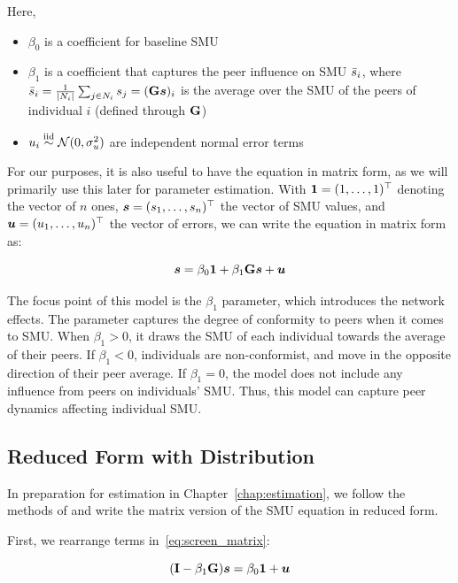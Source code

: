 Here,

\begin{itemize}
    \item $\beta_0$ is a coefficient for baseline SMU
    \item $\beta_1$ is a coefficient that captures the peer influence on SMU $\bar{s}_i$, where $\bar{s}_i = \frac{1}{|N_i|}\sum_{j \in N_i} s_j = (\mathbf{G}\bm{s})_i$ is the average over the SMU of the peers of individual $i$ (defined through $\mathbf{G}$)
    \item $u_i \stackrel{\text{iid}}{\sim} \mathcal{N}(0, \sigma_u^2)$ are independent normal error terms
\end{itemize}

For our purposes, it is also useful to have the equation in matrix form, as we will primarily use this later for parameter estimation. With $\bm{1} = (1, \ldots, 1)^\top$ denoting the vector of $n$ ones, $\bm{s} = (s_1, \ldots, s_n)^\top$ the vector of SMU values, and $\bm{u} = (u_1, \ldots, u_n)^\top$ the vector of errors, we can write the equation in matrix form as:

\begin{equation}
\label{eq:screen_matrix}
    \bm{s} = \beta_0 \bm{1} + \beta_1 \mathbf{G}\bm{s} + \bm{u}
\end{equation}

The focus point of this model is the $\beta_1$ parameter, which introduces the network effects. The parameter captures the degree of conformity to peers when it comes to SMU\@. When $\beta_1 > 0$, it draws the SMU of each individual towards the average of their peers. If $\beta_1 < 0$, individuals are non-conformist, and move in the opposite direction of their peer average. If $\beta_1 = 0$, the model does not include any influence from peers on individuals' SMU\@. Thus, this model can capture peer dynamics affecting individual SMU\@.

\subsection{Reduced Form with Distribution}

In preparation for estimation in Chapter~\ref{chap:estimation}, we follow the methods of \textcite[Sec.~2.3]{Bramoulle2009} and write the matrix version of the SMU equation in reduced form.

First, we rearrange terms in~\eqref{eq:screen_matrix}:

\begin{equation}
    \label{eq:screen_rearranged}
    (\mathbf{I} - \beta_1\mathbf{G})\bm{s} = \beta_0\bm{1} + \bm{u}
\end{equation}

